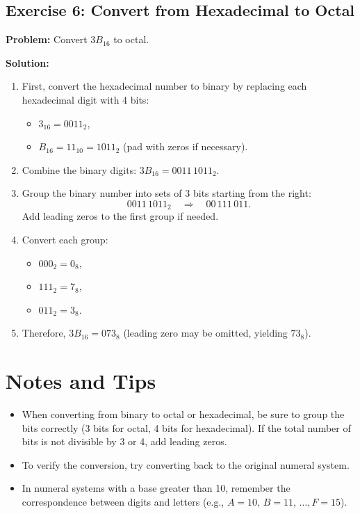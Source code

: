 \documentclass[12pt,a4paper]{article}
\begin{document}
\subsection{Exercise 6: Convert from Hexadecimal to Octal}
\textbf{Problem:} Convert \(3B_{16}\) to octal.

\textbf{Solution:}
\begin{enumerate}
    \item First, convert the hexadecimal number to binary by replacing each hexadecimal digit with 4 bits:
    \begin{itemize}
        \item \(3_{16} = 0011_2\),
        \item \(B_{16} = 11_{10} = 1011_2\) (pad with zeros if necessary).
    \end{itemize}
    \item Combine the binary digits: \(3B_{16} = 0011\,1011_2\).
    \item Group the binary number into sets of 3 bits starting from the right:
    \[
    0011\,1011_2 \quad \Rightarrow \quad 00\, 111\, 011.
    \]
    Add leading zeros to the first group if needed.
    \item Convert each group:
    \begin{itemize}
        \item \(000_2 = 0_8\),
        \item \(111_2 = 7_8\),
        \item \(011_2 = 3_8\).
    \end{itemize}
    \item Therefore, \(3B_{16} = 073_8\) (leading zero may be omitted, yielding \(73_8\)).
\end{enumerate}

\section{Notes and Tips}
\begin{itemize}
    \item When converting from binary to octal or hexadecimal, be sure to group the bits correctly (3 bits for octal, 4 bits for hexadecimal). If the total number of bits is not divisible by 3 or 4, add leading zeros.
    \item To verify the conversion, try converting back to the original numeral system.
    \item In numeral systems with a base greater than 10, remember the correspondence between digits and letters (e.g., \(A=10,\, B=11,\, \dots, F=15\)).
\end{itemize}
\end{document}
